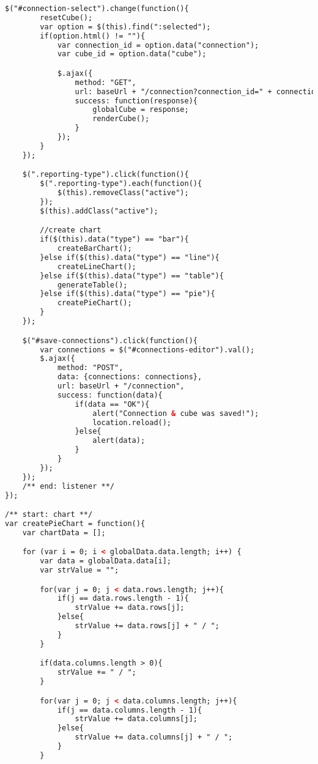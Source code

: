 \begin{lstlisting}[language=HTML,basicstyle=\tiny,caption=script.js]
    $("#connection-select").change(function(){
        resetCube();
        var option = $(this).find(":selected");
        if(option.html() != ""){
            var connection_id = option.data("connection");
            var cube_id = option.data("cube");

            $.ajax({
                method: "GET",
                url: baseUrl + "/connection?connection_id=" + connection_id + "&cube_id=" + cube_id,
                success: function(response){
                    globalCube = response;
                    renderCube();
                }
            });
        }
    });

    $(".reporting-type").click(function(){
        $(".reporting-type").each(function(){
            $(this).removeClass("active");
        });
        $(this).addClass("active");

        //create chart
        if($(this).data("type") == "bar"){
            createBarChart();
        }else if($(this).data("type") == "line"){
            createLineChart();
        }else if($(this).data("type") == "table"){
            generateTable();
        }else if($(this).data("type") == "pie"){
            createPieChart();
        }
    });

    $("#save-connections").click(function(){
        var connections = $("#connections-editor").val();
        $.ajax({
            method: "POST",
            data: {connections: connections},
            url: baseUrl + "/connection",
            success: function(data){
                if(data == "OK"){
                    alert("Connection & cube was saved!");
                    location.reload();
                }else{
                    alert(data);
                }
            }
        });
    });
    /** end: listener **/
});

/** start: chart **/
var createPieChart = function(){
    var chartData = [];

    for (var i = 0; i < globalData.data.length; i++) {
        var data = globalData.data[i];
        var strValue = "";

        for(var j = 0; j < data.rows.length; j++){
            if(j == data.rows.length - 1){
                strValue += data.rows[j];
            }else{
                strValue += data.rows[j] + " / ";
            }
        }

        if(data.columns.length > 0){
            strValue += " / ";
        }

        for(var j = 0; j < data.columns.length; j++){
            if(j == data.columns.length - 1){
                strValue += data.columns[j];
            }else{
                strValue += data.columns[j] + " / ";
            }
        }


\end{lstlisting}
